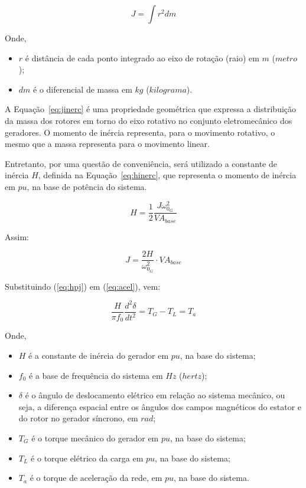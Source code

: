 \begin{equation}
	\label{eq:jinerc}
	J = \int{r^{2}}{dm}
\end{equation}

Onde,

\begin{itemize}
	\item[] $r$ {\'e} dist{\^a}ncia de cada ponto integrado ao eixo de rota{\c c}{\~a}o (raio) em $m$ ($metro$);
	\item[] $dm$ {\'e} o diferencial de massa em $kg$ ($kilograma$).
\end{itemize}

A Equa{\c c}{\~a}o~\ref{eq:jinerc} {\'e} uma propriedade geom{\'e}trica que expressa a distribui{\c c}{\~a}o da massa dos rotores em torno do eixo rotativo no conjunto eletromec{\^a}nico dos geradores. O momento de in{\'e}rcia representa, para o movimento rotativo, o mesmo que a massa representa para o movimento linear.

Entretanto, por uma quest{\~a}o de conveni{\^e}ncia, ser{\'a} utilizado a constante de in{\'e}rcia $H$, definida na Equa{\c c}{\~a}o~\ref{eq:hinerc}, que representa o momento de in{\'e}rcia em $pu$, na base de pot{\^e}ncia do sistema.

\begin{equation}
	\label{eq:hinerc}
	H = \frac{1}{2}\frac{J\omega_{0_{G}}^{2}}{VA_{base}}
\end{equation}

Assim:

\begin{equation}
	\label{eq:hpj}
	J = \frac{2H}{\omega_{0_{G}}^{2}}\cdot VA_{base}
\end{equation}

Substituindo (\ref{eq:hpj}) em (\ref{eq:acel}), vem:

\begin{equation}
	\label{eq:inerc}
	\frac{H}{\pi f_{0}} \frac{d^{2}\delta}{dt^{2}} = T_{G} - T_{L} = T_{a}
\end{equation}

Onde,

\begin{itemize}
	\item[] $H$ {\'e} a constante de in{\'e}rcia do gerador em $pu$, na base do sistema;
	\item[] $f_{0}$ {\'e} a base de frequ{\^e}ncia do sistema em $Hz$ ($hertz$);
	\item[] $\delta$ {\'e} o {\^a}ngulo de deslocamento el{\'e}trico em rela{\c c}{\~a}o ao sistema mec{\^a}nico, ou seja, a diferen{\c c}a espacial entre os {\^a}ngulos dos campos magn{\'e}ticos do estator e do rotor no gerador s{\'i}ncrono, em $rad$;
	\item[] $T_{G}$ {\'e} o torque mec{\^a}nico do gerador em $pu$, na base do sistema;
	\item[] $T_{L}$ {\'e} o torque el{\'e}trico da carga em $pu$, na base do sistema;
	\item[] $T_{a}$ {\'e} o torque de acelera{\c c}{\~a}o da rede, em $pu$, na base do sistema.
\end{itemize}

